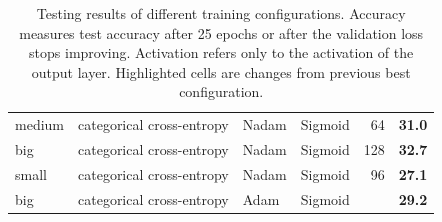 \documentclass[11pt, twocolumn]{article}
\begin{document}
\begin{table}
\begin{tabular}{@{}llllrr@{}}
        \cellcolor[HTML]{FFCCC9}medium & categorical cross-entropy                    & Nadam                         & Sigmoid                         & \multicolumn{1}{r|}{\cellcolor[HTML]{FFCCC9}64}                         & \textbf{31.0}                              \\
        big                            & categorical cross-entropy                    & Nadam                         & Sigmoid                         & \multicolumn{1}{r|}{\cellcolor[HTML]{9AFF99}128}                        & \textbf{32.7}                              \\
        \cellcolor[HTML]{FFCCC9}small  & categorical cross-entropy                    & Nadam                         & Sigmoid                         & \multicolumn{1}{r|}{96}                                                 & \textbf{27.1}                              \\
        big                            & categorical cross-entropy                    & \cellcolor[HTML]{FFCCC9}Adam  & Sigmoid                         & \multicolumn{1}{r|}{\cellcolor[HTML]{FFFFFF}{\color[HTML]{000000} 128}} & \textbf{29.2}                              \\
        \bottomrule
    \end{tabular}
    \caption{Testing results of different training configurations. Accuracy measures test accuracy after 25 epochs or after the validation loss stops improving. Activation refers only to the activation of the output layer. Highlighted cells are changes from previous best configuration. }
    \label{tab:results}
\end{table}
\end{document}
